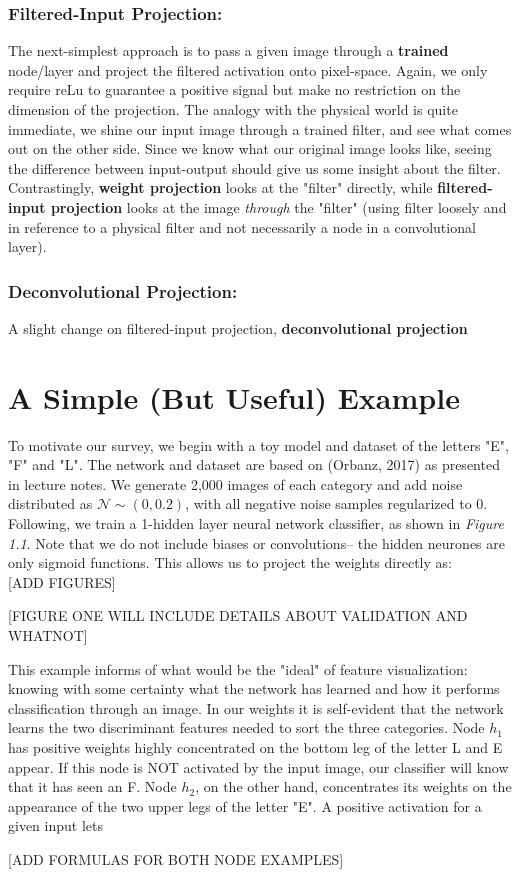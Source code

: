 \documentclass[12pt]{article}
\begin{document}
\subsubsection{Filtered-Input Projection:}
The next-simplest approach is to pass a given image through a \textbf{trained} node/layer and project the filtered activation onto pixel-space. Again, we only require reLu to guarantee a positive signal but make no restriction on the dimension of the projection. The analogy with the physical world is quite immediate, we shine our input image through a trained filter, and see what comes out on the other side. Since we know what our original image looks like, seeing the difference between input-output should give us some insight about the filter. Contrastingly, \textbf{weight projection} looks at the "filter" directly, while \textbf{filtered-input projection} looks at the image \textit{through} the "filter" (using filter loosely and in reference to a physical filter and not necessarily a node in a convolutional layer).

\subsubsection{Deconvolutional Projection:}
A slight change on filtered-input projection, \textbf{deconvolutional projection}

\section{A Simple (But Useful) Example}
To motivate our survey, we begin with a toy model and dataset of the letters "E", "F" and "L". The network and dataset are based on (Orbanz, 2017) as presented in lecture notes. We generate 2,000 images of each category and add noise distributed as $\mathcal{N} \sim (0, 0.2)$, with all negative noise samples regularized to 0. Following, we train a 1-hidden layer neural network classifier, as shown in \textit{Figure 1.1}. Note that we do not include biases or convolutions-- the hidden neurones are only sigmoid functions. This allows us to project the weights directly as: \\

[ADD FIGURES]

[FIGURE ONE WILL INCLUDE DETAILS ABOUT VALIDATION AND WHATNOT]

This example informs of what would be the "ideal" of feature visualization: knowing with some certainty what the network has learned and how it performs classification through an image. In our weights it is self-evident that the network learns the two discriminant features needed to sort the three categories. Node $h_1$ has positive weights highly concentrated on the bottom leg of the letter L and E appear. If this node is NOT activated by the input image, our classifier will know that it has seen an F. Node $h_2$, on the other hand, concentrates its weights on the appearance of the two upper legs of the letter "E". A positive activation for a given input lets 

[ADD FORMULAS FOR BOTH NODE EXAMPLES]
\end{document}
